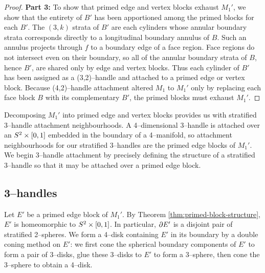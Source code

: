 \begin{proof}
	

	\textbf{Part 3:}
	To show that primed edge and vertex blocks exhaust $M_1'$, we show that the entirety of $B'$ has been apportioned among the primed blocks for each $B'$.
	The $(3,k)$ strata of $B'$ are each cylinders whose annular boundary strata corresponds directly to a longitudinal boundary annulus of $B$.
	Such an annulus projects through $f$ to a boundary edge of a face region.
	Face regions do not intersect even on their boundary, so all of the annular boundary strata of $B$, hence $B'$, are shared only by edge and vertex blocks.
	Thus each cylinder of $B'$ has been assigned as a (3,2)--handle and attached to a primed edge or vertex block.
	Because (4,2)--handle attachment altered $M_1$ to $M_1'$ only by replacing each face block $B$ with its complementary $B'$, the primed blocks must exhaust $M_1'$.
\end{proof}

Decomposing $M_1'$ into primed edge and vertex blocks provides us with stratified 3--handle attachment neighbourhoods.
A 4--dimensional 3--handle is attached over an $S^2\times[0,1]$ embedded in the boundary of a 4--manifold, so attachment neighbourhoods for our stratified 3--handles are the primed edge blocks of $M_1'$.
We begin 3--handle attachment by precisely defining the structure of a stratified 3--handle so that it may be attached over a primed edge block.

\subsection{3--handles}
\label{subsec:smooth-3handles}

Let $E'$ be a primed edge block of $M_1'$.
By Theorem \ref{thm:primed-block-structure}, $E'$ is homeomorphic to $S^2\times[0,1]$.
In particular, $\partial E'$ is a disjoint pair of stratified 2--spheres.
We form a 4--disk containing $E'$ in its boundary by a double coning method on $E'$: we first cone the spherical boundary components of $E'$ to form a pair of 3--disks, glue these 3--disks to $E'$ to form a 3--sphere, then cone the 3--sphere to obtain a 4--disk.

